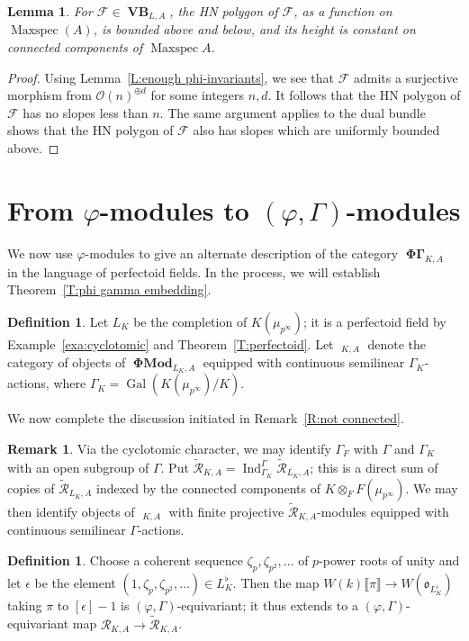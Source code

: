 \documentclass[12pt]{amsart}
\newtheorem{lemma}[theorem]{Lemma}
\theoremstyle{definition}
\newtheorem{defn}[theorem]{Definition}
\newtheorem{remark}[theorem]{Remark}
\numberwithin{equation}{theorem}
\newcommand{\calF}{\mathcal{F}}
\newcommand{\calO}{\mathcal{O}}
\newcommand{\calR}{\mathcal{R}}
\newcommand{\frako}{\mathfrak{o}}
\DeclareMathOperator{\Gal}{Gal}
\DeclareMathOperator{\Ind}{Ind}
\DeclareMathOperator{\Maxspec}{Maxspec}
\DeclareMathOperator{\PhiGamma}{\mathbf{\Phi \Gamma}}
\DeclareMathOperator{\PhiGammatilde}{\widetilde{\mathbf{\Phi \Gamma}}}
\DeclareMathOperator{\PhiMod}{\mathbf{\Phi Mod}}
\DeclareMathOperator{\VB}{\mathbf{VB}}
\begin{document}
\begin{lemma} \label{L:bounded slopes}
For $\calF \in \VB_{L,A}$, the HN polygon of $\calF$, as a function on $\Maxspec(A)$, is bounded above and below, and its height is constant on connected components of $\Maxspec A$.
\end{lemma}
\begin{proof}
Using Lemma~\ref{L:enough phi-invariants},
we see that $\calF$ admits a surjective morphism from $\calO(n)^{\oplus d}$ for some integers $n,d$. It follows that the HN polygon of $\calF$ has no slopes less than $n$.
The same argument applies to the dual bundle shows that the HN polygon of $\calF$ also has slopes which are uniformly bounded above.
\end{proof}
 

\section{From \texorpdfstring{$\varphi$}{phi}-modules to \texorpdfstring{$(\varphi, \Gamma)$}{(phi, Gamma)}-modules}
\label{sec:alternate}

We now use $\varphi$-modules to give an alternate description of the category $\PhiGamma_{K,A}$ in the language of perfectoid fields. In the process, we will establish Theorem~\ref{T:phi gamma embedding}.

\begin{defn}
Let $L_K$ be the completion of $K(\mu_{p^\infty})$; it is a perfectoid field by
Example~\ref{exa:cyclotomic} and Theorem~\ref{T:perfectoid}.
Let $\PhiGammatilde_{K,A}$ denote the category of objects of $\PhiMod_{L_K,A}$ equipped with continuous semilinear $\Gamma_K$-actions, where $\Gamma_K = \Gal(K(\mu_{p^\infty})/K)$.
\end{defn}

We now complete the discussion initiated in Remark~\ref{R:not connected}.
\begin{remark} \label{R:not connected2}
Via the cyclotomic character, we may identify $\Gamma_F$ with $\Gamma$ and $\Gamma_K$ with an open subgroup of $\Gamma$. Put $\tilde{\calR}_{K,A} = \Ind_{\Gamma_K}^\Gamma \tilde{\calR}_{L_K,A}$; this is a direct sum of copies of $\tilde{\calR}_{L_K,A}$ indexed by the connected components of $K \otimes_F F(\mu_{p^\infty})$. 
We may then identify objects of $\PhiGammatilde_{K,A}$ with finite projective
$\tilde{\calR}_{K,A}$-modules equipped with continuous semilinear $\Gamma$-actions.
\end{remark}

\begin{defn} \label{D:untilde to tilde map}
Choose a coherent sequence $\zeta_p, \zeta_{p^2}, \dots$ of $p$-power roots of unity
and let $\epsilon$ be the element $(1, \zeta_p, \zeta_{p^2}, \dots) \in L_K^{\flat}$.
Then the map $W(k) \llbracket \pi \rrbracket \to W(\frako_{L^\flat_K})$ taking $\pi$ to $[\epsilon]-1$
is $(\varphi, \Gamma)$-equivariant; it thus extends to a $(\varphi, \Gamma)$-equivariant map $\calR_{K,A} \to \tilde{\calR}_{K,A}$.
\end{defn}
\end{document}
